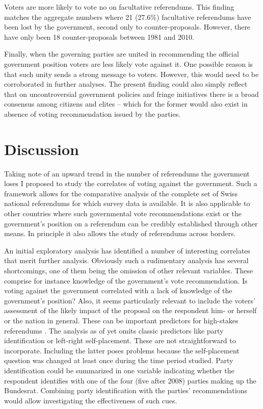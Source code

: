 \documentclass[11pt,a4paper]{article}\usepackage[]{graphicx}\usepackage[]{color}
\begin{document}
    Voters are more likely to vote no on facultative referendums. This finding matches the aggregate numbers where 21 (27.6\%) facultative referendums have been lost by the government, second only to counter-proposals. However, there have only been 18 counter-proposals between 1981 and 2010.
    
    Finally, when the governing parties are united in recommending the official government position voters are less likely vote against it. One possible reason is that such unity sends a strong message to voters. However, this would need to be corroborated in further analyses. The present finding could also simply reflect that on uncontroversial government policies and fringe initiatives there is a broad consensus among citizens and elites -- which for the former would also exist in absence of voting recommendation issued by the parties. 
    
    \section{Discussion}\label{sec:discussion}
    
    
    Taking note of an upward trend in the number of referendums the government loses I proposed to study the correlates of voting against the government. Such a framework allows for the comparative analysis of the complete set of Swiss national referendums for which survey data is available. It is also applicable to other countries where such governmental vote recommendations exist or the government's position on a referendum can be credibly established through other means. In principle it also allows the study of referendums across borders. 
    
    An initial exploratory analysis has identified a number of interesting correlates that merit further analysis. Obviously such a rudimentary analysis has several shortcomings, one of them being the omission of other relevant variables. %
    These comprise for instance knowledge of the government's vote recommendation. Is voting against the government correlated with a lack of knowledge of the government's position? Also, it seems particularly relevant to include the voters' assessment of the likely impact of the proposal on the respondent him- or herself or the nation in general. These can be important predictors for high-stakes referendums \citep{nadeau_attitude_1999}. The analysis as of yet omits classic predictors like party identification or left-right self-placement. These are not straightforward to incorporate. Including the latter poses problems because the self-placement question was changed at least once during the time period studied. Party identification could be summarized in one variable indicating whether the respondent identifies with one of the four (five after 2008) parties making up the Bundesrat. Combining party identification with the parties' recommendations would allow investigating the effectiveness of such cues. 
    
\end{document}
